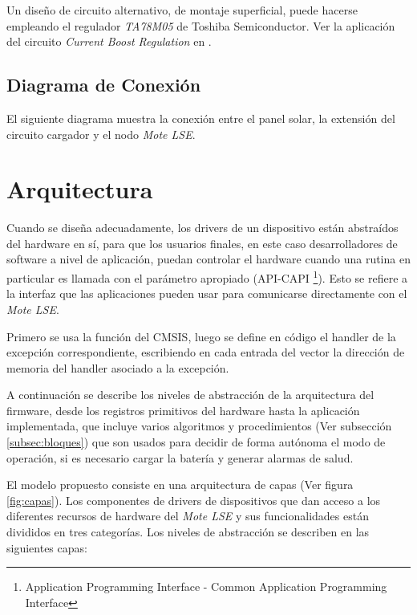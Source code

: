 {Un diseño de circuito alternativo, de montaje superficial, puede hacerse empleando el regulador \textit{TA78M05} de Toshiba Semiconductor. Ver la aplicación del circuito \textit{Current Boost Regulation} en \citep{78M05}.


\subsection{Diagrama de Conexión}
\label{subsec:conexión}
El siguiente diagrama muestra la conexión entre el panel solar, la extensión del circuito cargador y el nodo \textit{Mote LSE}.

\section{Arquitectura}
\label{sec:arq}
Cuando se diseña adecuadamente, los drivers de un dispositivo están abstraídos del hardware en sí, para que los usuarios finales, en este caso desarrolladores de software a nivel de aplicación, puedan controlar el hardware cuando una rutina en particular es llamada con el parámetro apropiado (API-CAPI \footnote{Application Programming Interface - Common Application Programming Interface}). Esto se refiere a la interfaz que las aplicaciones pueden usar para comunicarse directamente con el \textit{Mote LSE}.

Primero se usa la función del CMSIS, luego se define en código el handler de la excepción correspondiente, escribiendo en cada entrada del vector la dirección de memoria del handler asociado a la excepción.

A continuación se describe los niveles de abstracción de la arquitectura del firmware, desde los registros primitivos del hardware hasta la aplicación implementada, que incluye varios algoritmos y procedimientos (Ver subsección \ref{subsec:bloques}) que son usados para decidir de forma autónoma el modo de operación, si es necesario cargar la batería y generar alarmas de salud.

El modelo propuesto consiste en una arquitectura de capas (Ver figura \ref{fig:capas}). Los componentes de drivers de dispositivos que dan acceso a los diferentes recursos de hardware del \textit{Mote LSE} y sus funcionalidades están divididos en tres categorías. Los niveles de abstracción se describen en las siguientes capas:

}
